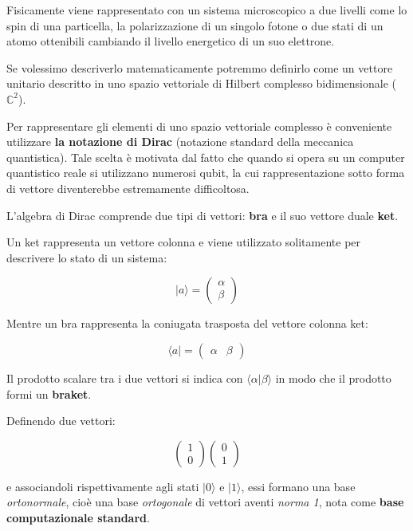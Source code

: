 Fisicamente viene rappresentato con un sistema microscopico a due livelli come lo spin di una particella, la polarizzazione di un singolo fotone o due stati di un atomo ottenibili cambiando il livello energetico di un suo elettrone.

Se volessimo descriverlo matematicamente potremmo definirlo come un vettore unitario descritto in uno spazio vettoriale di Hilbert complesso bidimensionale (\(\mathbb{C}^2\)).

Per rappresentare gli elementi di uno spazio vettoriale complesso è conveniente utilizzare \textbf{la notazione di Dirac} (notazione standard della meccanica quantistica). Tale scelta è motivata dal fatto che quando si opera su un computer quantistico reale si utilizzano numerosi qubit, la cui rappresentazione sotto forma di vettore diventerebbe estremamente difficoltosa.

L'algebra di Dirac comprende due tipi di vettori: \textbf{bra} e il suo vettore duale \textbf{ket}.

Un ket rappresenta un vettore colonna e viene utilizzato solitamente per descrivere lo stato di un sistema:

\[
  | a \rangle = \begin{pmatrix} \alpha \\ \beta \end{pmatrix}
\]

Mentre un bra rappresenta la coniugata trasposta del vettore colonna ket:

\[
  \langle a | = \begin{pmatrix} \alpha & \beta \end{pmatrix}
\]

Il prodotto scalare tra i due vettori si indica con \(\langle \alpha | \beta \rangle\) in modo che il prodotto formi un \textbf{braket}.

Definendo due vettori:

\[
  \begin{pmatrix} 1 \\ 0 \end{pmatrix}
  \begin{pmatrix} 0 \\ 1 \end{pmatrix}
\]

e associandoli rispettivamente agli stati \( | 0 \rangle\) e \( | 1 \rangle\), essi formano una base \textit{ortonormale}, cioè una base \textit{ortogonale} di vettori aventi \textit{norma 1}, nota come \textbf{base computazionale standard}.

